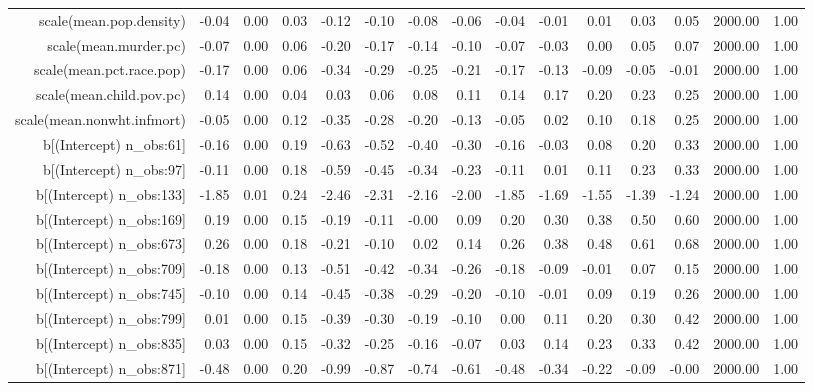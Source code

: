 \begin{table}[ht]
\begin{tabular}{rrrrrrrrrrrrrrr}
  scale(mean.pop.density) & -0.04 & 0.00 & 0.03 & -0.12 & -0.10 & -0.08 & -0.06 & -0.04 & -0.01 & 0.01 & 0.03 & 0.05 & 2000.00 & 1.00 \\ 
  scale(mean.murder.pc) & -0.07 & 0.00 & 0.06 & -0.20 & -0.17 & -0.14 & -0.10 & -0.07 & -0.03 & 0.00 & 0.05 & 0.07 & 2000.00 & 1.00 \\ 
  scale(mean.pct.race.pop) & -0.17 & 0.00 & 0.06 & -0.34 & -0.29 & -0.25 & -0.21 & -0.17 & -0.13 & -0.09 & -0.05 & -0.01 & 2000.00 & 1.00 \\ 
  scale(mean.child.pov.pc) & 0.14 & 0.00 & 0.04 & 0.03 & 0.06 & 0.08 & 0.11 & 0.14 & 0.17 & 0.20 & 0.23 & 0.25 & 2000.00 & 1.00 \\ 
  scale(mean.nonwht.infmort) & -0.05 & 0.00 & 0.12 & -0.35 & -0.28 & -0.20 & -0.13 & -0.05 & 0.02 & 0.10 & 0.18 & 0.25 & 2000.00 & 1.00 \\ 
  b[(Intercept) n\_obs:61] & -0.16 & 0.00 & 0.19 & -0.63 & -0.52 & -0.40 & -0.30 & -0.16 & -0.03 & 0.08 & 0.20 & 0.33 & 2000.00 & 1.00 \\ 
  b[(Intercept) n\_obs:97] & -0.11 & 0.00 & 0.18 & -0.59 & -0.45 & -0.34 & -0.23 & -0.11 & 0.01 & 0.11 & 0.23 & 0.33 & 2000.00 & 1.00 \\ 
  b[(Intercept) n\_obs:133] & -1.85 & 0.01 & 0.24 & -2.46 & -2.31 & -2.16 & -2.00 & -1.85 & -1.69 & -1.55 & -1.39 & -1.24 & 2000.00 & 1.00 \\ 
  b[(Intercept) n\_obs:169] & 0.19 & 0.00 & 0.15 & -0.19 & -0.11 & -0.00 & 0.09 & 0.20 & 0.30 & 0.38 & 0.50 & 0.60 & 2000.00 & 1.00 \\ 
  b[(Intercept) n\_obs:673] & 0.26 & 0.00 & 0.18 & -0.21 & -0.10 & 0.02 & 0.14 & 0.26 & 0.38 & 0.48 & 0.61 & 0.68 & 2000.00 & 1.00 \\ 
  b[(Intercept) n\_obs:709] & -0.18 & 0.00 & 0.13 & -0.51 & -0.42 & -0.34 & -0.26 & -0.18 & -0.09 & -0.01 & 0.07 & 0.15 & 2000.00 & 1.00 \\ 
  b[(Intercept) n\_obs:745] & -0.10 & 0.00 & 0.14 & -0.45 & -0.38 & -0.29 & -0.20 & -0.10 & -0.01 & 0.09 & 0.19 & 0.26 & 2000.00 & 1.00 \\ 
  b[(Intercept) n\_obs:799] & 0.01 & 0.00 & 0.15 & -0.39 & -0.30 & -0.19 & -0.10 & 0.00 & 0.11 & 0.20 & 0.30 & 0.42 & 2000.00 & 1.00 \\ 
  b[(Intercept) n\_obs:835] & 0.03 & 0.00 & 0.15 & -0.32 & -0.25 & -0.16 & -0.07 & 0.03 & 0.14 & 0.23 & 0.33 & 0.42 & 2000.00 & 1.00 \\ 
  b[(Intercept) n\_obs:871] & -0.48 & 0.00 & 0.20 & -0.99 & -0.87 & -0.74 & -0.61 & -0.48 & -0.34 & -0.22 & -0.09 & -0.00 & 2000.00 & 1.00 \\ 

\end{tabular}
\end{table}
